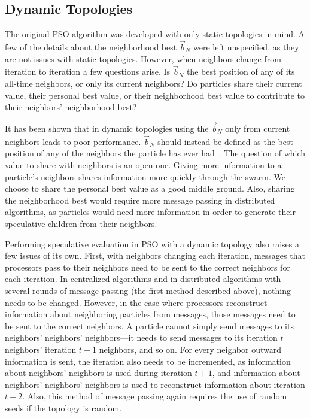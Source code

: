 \documentclass[conference,letterpaper]{IEEEtran}
\providecommand{\nbest}{\ensuremath{\Vec{b}_N}}
\begin{document}
\subsection{Dynamic Topologies}

The original PSO algorithm was developed with only static topologies in mind. A
few of the details about the neighborhood best $\nbest$ were left unspecified,
as they are not issues with static topologies.  However, when neighbors change
from iteration to iteration a few questions arise.  Is $\nbest$ the best
position of any of its all-time neighbors, or only its current neighbors?  Do
particles share their current value, their personal best value, or their
neighborhood best value to contribute to their neighbors' neighborhood best?

It has been shown that in dynamic topologies using the $\nbest$ only from
current neighbors leads to poor performance.  $\nbest$ should instead be
defined as the best position of any of the neighbors the particle has ever
had~\cite{mcnabb-cec09}.  The question of which value to share with neighbors
is an open one.  Giving more information to a particle's neighbors shares
information more quickly through the swarm.  We choose to share the personal
best value as a good middle ground.  Also, sharing the neighborhood best would
require more message passing in distributed algorithms, as particles would need
more information in order to generate their speculative children from their
neighbors.

Performing speculative evaluation in PSO with a dynamic topology also raises a
few issues of its own.  First, with neighbors changing each iteration, messages
that processors pass to their neighbors need to be sent to the correct
neighbors for each iteration.  In centralized algorithms and in distributed
algorithms with several rounds of message passing (the first method described
above), nothing needs to be changed.  However, in the case where processors
reconstruct information about neighboring particles from messages, those
messages need to be sent to the correct neighbors.  A particle cannot simply
send messages to its neighbors' neighbors' neighbors---it needs to send
messages to its iteration $t$ neighbors' iteration $t+1$ neighbors, and so on.
For every neighbor outward information is sent, the iteration also needs to be
incremented, as information about neighbors' neighbors is used during iteration
$t+1$, and information about neighbors' neighbors' neighbors is used to
reconstruct information about iteration $t+2$.  Also, this method of message
passing again requires the use of random seeds if the topology is random.
\end{document}
